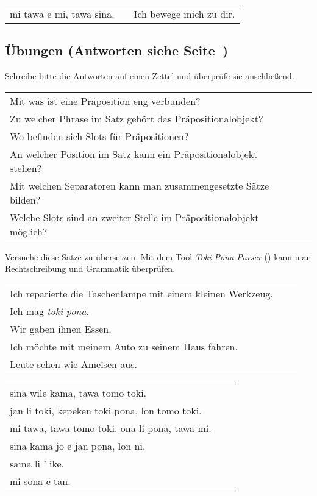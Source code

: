 \begin{supertabular}{p{5,5cm}|ll}
mi tawa e mi, tawa sina. && Ich bewege mich zu dir. \\ %
\end{supertabular} 

%
\newpage
%
\subsection*{Übungen (Antworten siehe Seite~\pageref{'prepositional_objects'})}
%
Schreibe bitte die Antworten auf einen Zettel und überprüfe sie anschließend. 

\begin{supertabular}{p{5,5cm}|ll}
Mit was ist eine Präposition eng verbunden? &&   \\ %
Zu welcher Phrase im Satz gehört das Präpositionalobjekt? &&    \\ %
Wo befinden sich Slots für Präpositionen? &&   \\ %
An welcher Position im Satz kann ein Präpositionalobjekt stehen? &&  \\ %
Mit welchen Separatoren kann man zusammengesetzte Sätze bilden? &&   \\ %
Welche Slots sind an zweiter Stelle im Präpositionalobjekt möglich? &&   \\ %
\end{supertabular}

Versuche diese Sätze zu übersetzen. 
Mit dem Tool \textit{Toki Pona Parser} (\cite{www:rowa:02}) kann man Rechtschreibung und Grammatik überprüfen. 

\begin{supertabular}{p{5,5cm}|ll}
Ich reparierte die Taschenlampe mit einem kleinen Werkzeug.  &&  \\ %
Ich mag \textit{toki pona}.  &&  \\ %
Wir gaben ihnen Essen.  &&  \\ %
Ich möchte mit meinem Auto zu seinem Haus fahren.  &&  \\ %
Leute sehen wie Ameisen aus. && \\ %
\end{supertabular}

\begin{supertabular}{p{5,5cm}|ll}
sina wile kama, tawa tomo toki.  &&  \\ %
jan li toki, kepeken toki pona, lon tomo toki.  &&  \\ %
mi tawa, tawa tomo toki. ona li pona, tawa mi.  &&  \\ %
sina kama jo e jan pona, lon ni.  &&  \\ %
sama li ' ike. &&  \\ %
mi sona e tan. &&  \\ %
\end{supertabular} 

%
